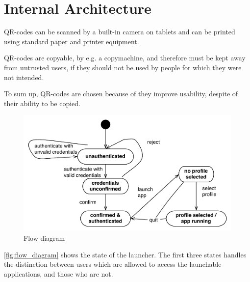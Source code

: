 \section{Internal Architecture}

QR-codes can be scanned by a built-in camera on tablets and can be printed using standard paper and printer equipment. 

QR-codes are copyable, by e.g. a copymachine, and therefore must be kept away from untrusted users, if they should not be used by people for which they were not intended.

To sum up, QR-codes are chosen because of they improve usability, despite of their ability to be copied.

\begin{figure}[h]
	\centering
	\includegraphics[width=1\textwidth]{gfx/flow-diagram2.pdf}
	\caption{Flow diagram}
	\label{fig:flow_diagram}
\end{figure}

\autoref{fig:flow_diagram} shows the state of the launcher. The first three states handles the distinction between users which are allowed to access the launchable applications, and those who are not. 


